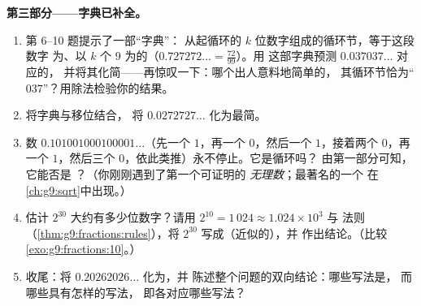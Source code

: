 \begin{problem}
\medskip
\noindent\textbf{第三部分——字典已补全。}
\begin{enumerate}[resume]
  \item 第 6--10 题提示了一部“字典”：
        从起循环的 $k$ 位数字组成的循环节，等于这段数字
        为、以 $k$ 个 9 为的（$0.727272\ldots = \frac{72}{99}$）。用
        这部字典预测 $0.037037\ldots$ 对应的，
        并将其化简——再惊叹一下：哪个出人意料地简单的，
        其循环节恰为“$037$”？用除法检验你的结果。
  \item 将字典与移位结合，
        将 $0.0272727\ldots$ 化为最简。
  \item 数 $0.101001000100001\ldots$（先一个 $1$，再一个
        $0$，然后一个 $1$，接着两个 $0$，再一个 $1$，然后三个
        $0$，依此类推）永不停止。它是循环吗？
        由第一部分可知，它能否是
        ？（你刚刚遇到了第一个可证明的
        \emph{无理数}；最著名的一个
        在\cref{ch:g9:sqrt}中出现。）
  \item 估计 $2^{30}$ 大约有多少位数字？请用
        $2^{10} = 1\,024 \approx 1.024 \times 10^3$ 与
        法则（\cref{thm:g9:fractions:rules}），将
        $2^{30}$ 写成（近似的），并
        作出结论。（比较\cref{exo:g9:fractions:10}。）
  \item 收尾：将 $0.20262026\ldots$ 化为，并
        陈述整个问题的双向结论：哪些写法是，
        而哪些具有怎样的写法，
        即各对应哪些写法？
\end{enumerate}
\end{problem}

